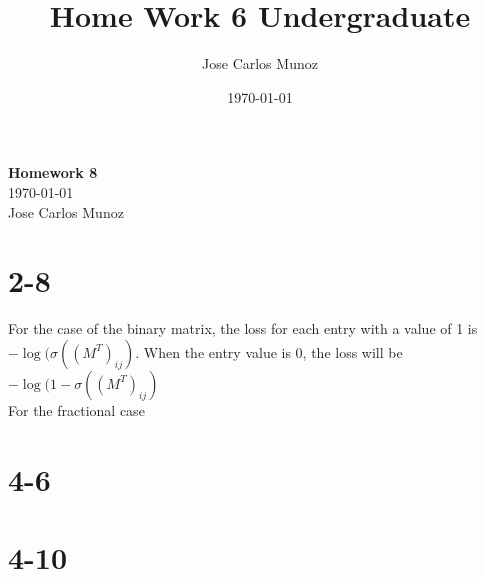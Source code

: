 \documentclass[12pt,english]{article}
\title{Home Work 6 Undergraduate}
\date{\today}
\author{Jose Carlos Munoz}
\begin{document}
\begin{center}
    \Large
    \textbf{Homework 8}\\
    \small
    \today\\
    \large
    Jose Carlos Munoz
\end{center}
\section*{2-8}
For the case of the binary matrix, the loss for each entry with a value of 1 is $-\log{(\sigma ((M^T)_{ij})}$. When the entry value is 0, the loss will be $-\log{( 1- \sigma ((M^T)_{ij})}$\\
For the fractional case
\section*{4-6}

\section*{4-10}
\end{document}
